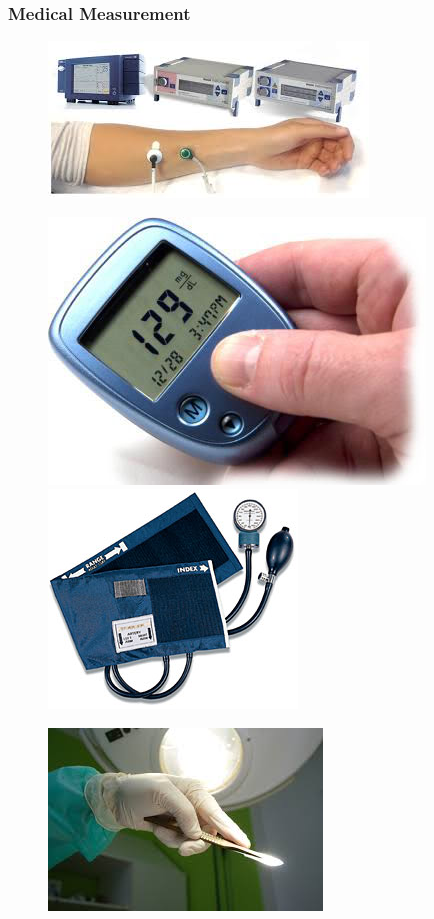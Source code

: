 \documentclass[compress]{beamer}        %
\begin{document}
		
\begin{frame}
\frametitle{Medical Measurement}
\begin{figure}
\centering
\includegraphics[width=0.4\linewidth]{"clinical measurement"}
\end{figure}
\begin{figure}
\centering
\includegraphics[width=0.35\linewidth]{diabetes}
\includegraphics[width=0.35\linewidth]{bpcuff}
\end{figure}

\end{frame}
\begin{frame}
	
\begin{figure}
\centering
\includegraphics[width=0.7\linewidth]{invasiveprocedures}
\end{figure}

\end{frame}
\end{document}
